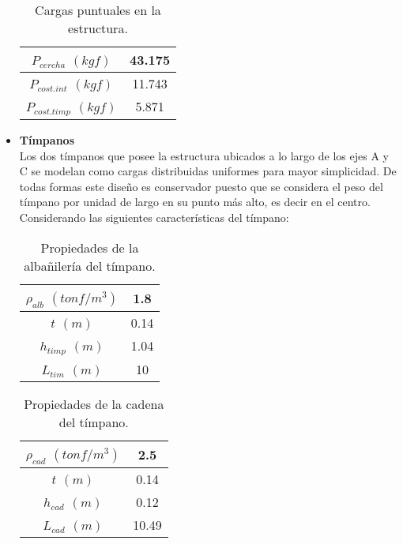 \begin{itemize}
        \begin{table}[H]
      \centering
      \caption{Cargas puntuales en la estructura.}
      \begin{tabular}{|c|c|}
        \hline
        \boldmath{}\textbf{$P_{cercha} $ $(kgf)$}\unboldmath{} & 43.175 \bigstrut\\
        \hline
        \boldmath{}\textbf{$P_{cost.int} $ $ (kgf)$}\unboldmath{} & 11.743 \bigstrut\\
        \hline
        \boldmath{}\textbf{$P_{cost.timp}$ $(kgf)$}\unboldmath{} & 5.871 \bigstrut\\
        \hline
      \end{tabular}
      \label{cargaspuntuales}
    \end{table}


    \item \textbf{Tímpanos}\\
    Los dos tímpanos que posee la estructura ubicados a lo largo de los ejes A y C se modelan como cargas distribuidas uniformes para mayor simplicidad. De todas formas este diseño es conservador puesto que se considera el peso del tímpano por unidad de largo en su punto más alto, es decir en el centro. Considerando las siguientes características del tímpano:
    
    \begin{table}[H]
  \centering
  \caption{Propiedades de la albañilería del tímpano.}
  \begin{tabular}{|c|c|}
    \hline
    \boldmath{}\textbf{$\rho_{alb} $ $ (tonf/m^3)$}\unboldmath{} & 1.8 \bigstrut\\
    \hline
    \boldmath{}\textbf{$t $ $ (m)$}\unboldmath{} & 0.14 \bigstrut\\
    \hline
    \boldmath{}\textbf{$h_{timp} $ $ (m)$}\unboldmath{} & 1.04 \bigstrut\\
    \hline
    \boldmath{}\textbf{$L_{tim} $ $ (m)$}\unboldmath{} & 10 \bigstrut\\
    \hline
  \end{tabular}
  \label{albtimpano}
\end{table}

    \begin{table}[H]
  \centering
  \caption{Propiedades de la cadena del tímpano.}
  \begin{tabular}{|c|c|}
    \hline
    \boldmath{}\textbf{$\rho_{cad} $ $ (tonf/m^3)$}\unboldmath{} & 2.5 \bigstrut\\
    \hline
    \boldmath{}\textbf{$t$ $(m)$}\unboldmath{} & 0.14 \bigstrut\\
    \hline
    \boldmath{}\textbf{$h_{cad}$ $ (m)$}\unboldmath{} & 0.12 \bigstrut\\
    \hline
    \boldmath{}\textbf{$L_{cad} $ $ (m)$}\unboldmath{} & 10.49 \bigstrut\\
    \hline
  \end{tabular}
  \label{cadtimpano}
\end{table}


\end{itemize}
